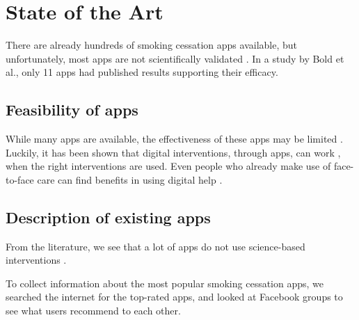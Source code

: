 \section{State of the Art}
\label{sec:SOTA}

There are already hundreds of smoking cessation apps available, but unfortunately, most apps are not scientifically validated \cite{boldSmartphoneAppsSmoking2023}. In a study by Bold et al., only 11 apps had published results supporting their efficacy.




\subsection{Feasibility of apps}


While many apps are available, the effectiveness of these apps may be limited \cite{mershaEffectivenessTechnologybasedInterventions2021,abromsContentAnalysisPopular2013}. Luckily, it has been shown that digital interventions, through apps, can work \cite{mershaEffectivenessTechnologybasedInterventions2021, PersonalizedDigitalTools2025a}, when the right interventions are used.
Even people who already make use of face-to-face care can find benefits in using digital help \cite{mershaEffectivenessTechnologybasedInterventions2021}.

\subsection{Description of existing apps}


From the literature, we see that a lot of apps do not use science-based interventions \cite{goldgofEfficacyQuitSureApp2024}.

To collect information about the most popular smoking cessation apps, we searched the internet for the top-rated apps, and looked at Facebook groups to see what users recommend to each other.

